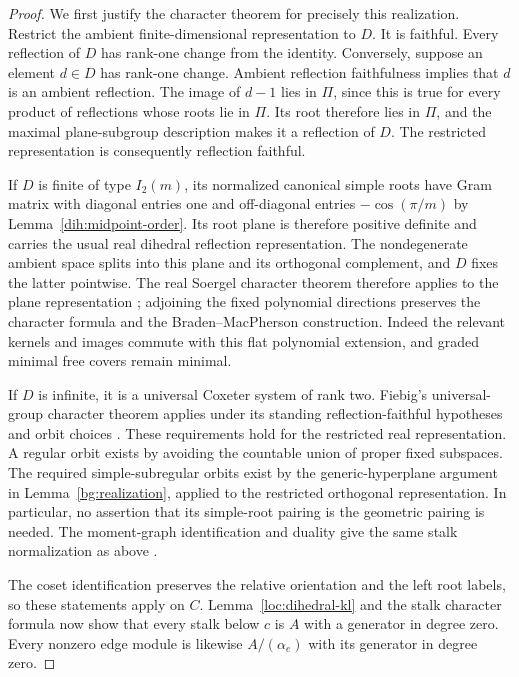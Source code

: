 \begin{proof}
We first justify the character theorem for precisely this realization.
Restrict the ambient finite-dimensional representation to $D$.
It is faithful.  Every reflection of $D$ has rank-one change from the
identity.  Conversely, suppose an element $d\in D$ has rank-one change.
Ambient reflection faithfulness implies that $d$ is an ambient
reflection.  The image of $d-1$ lies in $\Pi$, since this is true for every
product of reflections whose roots lie in $\Pi$.  Its root therefore
lies in $\Pi$, and the maximal plane-subgroup description makes it a
reflection of $D$.  The restricted representation is consequently
reflection faithful.

If $D$ is finite of type $I_2(m)$, its normalized canonical simple roots
have Gram matrix with diagonal entries one and off-diagonal entries
$-\cos(\pi/m)$ by Lemma~\ref{dih:midpoint-order}. Its root plane is therefore
positive definite and
carries the usual real dihedral reflection representation.  The nondegenerate
ambient space splits into this plane and its orthogonal complement,
and $D$ fixes the latter pointwise.  The real Soergel character theorem
therefore applies to the plane representation \cite{EW14}; adjoining
the fixed polynomial directions preserves the character formula and the
Braden--MacPherson construction.  Indeed the relevant kernels and images
commute with this flat polynomial extension, and graded minimal free
covers remain minimal.

If $D$ is infinite, it is a universal Coxeter system of rank two.
Fiebig's universal-group character theorem applies under its standing
reflection-faithful hypotheses and orbit choices
\cite[Definition~2.1, Sections~2 and~5, and Theorem~9.3]{Fiebig08}.
These requirements hold for the restricted real representation. A regular
orbit exists by avoiding the countable union of proper fixed subspaces.
The required simple-subregular orbits exist by the generic-hyperplane
argument in Lemma~\ref{bg:realization}, applied to the restricted
orthogonal representation.
In particular, no assertion that its simple-root pairing is the
geometric pairing is needed.
The moment-graph identification and
duality give the same stalk normalization as above
\cite[Corollary~6.5 and Proposition~7.1(4)]{Fiebig08}.

The coset identification preserves the relative orientation and the
left root labels, so these statements apply on $C$.
Lemma~\ref{loc:dihedral-kl} and the stalk character formula now show that
every stalk below $c$ is $A$ with a generator in degree zero.
Every nonzero edge module is likewise $A/(\alpha_e)$ with its generator
in degree zero.


\end{proof}
